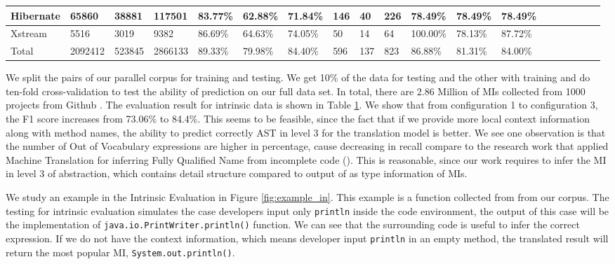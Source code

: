 \begin{table}[t]
\begin{tabular}{|l|l|l|l|l|l|l|l|l|l|l|l|l|l|l|l|l|l|l|}
\hline
Hibernate & 65860                                     & 38881  & 117501  & 83.77\%   & 62.88\% & 71.84\% & 146            & 40    & 226   & 78.49\%   & 78.49\% & 78.49\%  \\
\hline
Xstream   & 5516                                      & 3019   & 9382    & 86.69\%   & 64.63\% & 74.05\% & 50             & 14    & 64    & 100.00\%  & 78.13\% & 87.72\%  \\
\hline
Total     & 2092412                                   & 523845 & 2866133 & 89.33\%   & 79.98\% & 84.40\%   & 596           & 137   & 823   & 86.88\%   & 81.31\% & 84.00\%   \\
\hline
\end{tabular}

\label{tbl:IntrinsicAndExtrinsic}
\end{table}


We split the pairs of our parallel corpus for training and testing. We get 10\% of the data for testing and the other with training and do ten-fold cross-validation to test the ability of prediction on our full data set. In total, there are 2.86 Million of MIs collected from 1000 projects from Github \cite{id:Github}.
The evaluation result for intrinsic data is shown in Table \ref{tbl:IntrinsicAndExtrinsic}. We show that from configuration 1 to configuration 3, the F1 score increases from 73.06\% to 84.4\%. This seems to be feasible, since the fact that if we provide more local context information along with method names, the ability to predict correctly AST in level 3 for the translation model is better. We see one observation is that the number of Out of Vocabulary expressions are higher in percentage, cause decreasing in recall compare to the research work that applied Machine Translation for inferring Fully Qualified Name from incomplete code (\cite{8453132}). This is reasonable, since our work requires to infer the MI in level 3 of abstraction, which contains detail structure compared to output of \cite{8453132} as type information of MIs. 

We study an example in the Intrinsic Evaluation in Figure \ref{fig:example_in}. This example is a function collected from \cite{id:IntrinsicAndroidExample} from our corpus. The testing for intrinsic evaluation simulates the case developers input only \texttt{println} inside the code environment, the output of this case will be the implementation of \texttt{java.io.PrintWriter.println()} function. We can see that the surrounding code is useful to infer the correct expression. If we do not have the context information, which means developer input \texttt{println} in an empty method, the translated result will return the most popular MI, \texttt{System.out.println()}.

